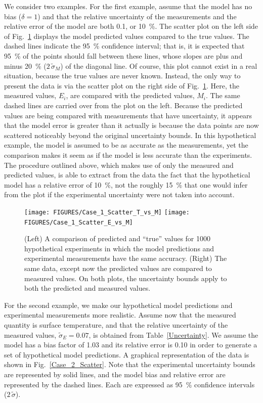We consider two examples. For the first example, assume that the model has no bias ($\delta=1$) and that the relative uncertainty of the measurements and the
relative error of the model are both 0.1, or 10~\%. The scatter plot on the left side of Fig.~\ref{Case_1_Scatter} displays the model predicted values compared to the
true values. The dashed lines indicate the 95~\% confidence interval; that is, it is expected that 95~\% of the points should fall between these
lines, whose slopes are plus and minus 20~\% ($2\, \widetilde{\sigma}_M$) of the diagonal line. Of course, this plot cannot exist in a real situation, because the true
values are never known. Instead, the only way to present the data is via the scatter plot on the right side of Fig.~\ref{Case_1_Scatter}. Here, the measured values, $E_i$, are
compared with the predicted values, $M_i$. The same dashed lines are carried over from the plot on the left. Because the predicted values are being compared
with measurements that have uncertainty, it appears that the model error is greater than it actually is because the data points are now scattered noticeably beyond the
original uncertainty bounds. In this hypothetical example, the model is
assumed to be as accurate as the measurements, yet the comparison makes it seem as if the model is less accurate than the experiments. The procedure outlined
above, which makes use of only the measured and predicted values, is able to extract from the data the fact that the hypothetical model has a
relative error of 10~\%, not the roughly 15~\% that one would infer from the plot if the experimental uncertainty were not taken into account.

\begin{figure}[t]
\begin{center}
\texttt{[image: FIGURES/Case\_1\_Scatter\_T\_vs\_M]}
\texttt{[image: FIGURES/Case\_1\_Scatter\_E\_vs\_M]}
\end{center}
\caption[Verification of the model error calculation, Case 1.]{(Left) A comparison of predicted and ``true'' values for 1000 hypothetical
experiments in which the model predictions and experimental measurements have the same accuracy.
(Right) The same data, except now the predicted values are compared to measured values. On both plots, the uncertainty bounds apply to both
the predicted and measured values.}
\label{Case_1_Scatter}
\end{figure}


For the second example, we make our hypothetical model predictions and experimental measurements more realistic. Assume now that the
measured quantity is surface temperature, and that the relative uncertainty of the measured values, $\widetilde{\sigma}_E=0.07$, is obtained from Table~\ref{Uncertainty}.
We assume the model has a bias factor of 1.03 and its relative error is 0.10 in order to generate a set of hypothetical model predictions.
A graphical representation of the data is shown in Fig.~\ref{Case_2_Scatter}. Note that the
experimental uncertainty bounds are represented by solid lines, and the model bias and relative error are represented by the dashed lines.
Each are expressed as 95~\% confidence intervals ($2 \, \widetilde{\sigma}$).

